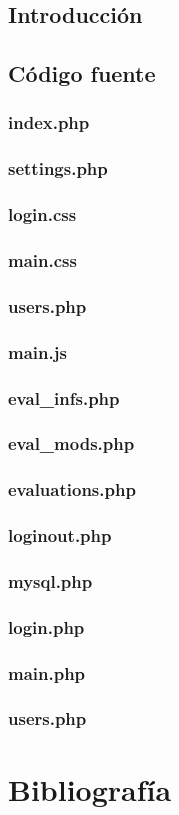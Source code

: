 \documentclass[12pt,a4paper,spanish,twoside]{article}
\begin{document}
\subsection{Introducción}
\subsection{Código fuente}
\subsubsection{index.php}

\subsubsection{settings.php}

\subsubsection{login.css}
%
\subsubsection{main.css}
%
\subsubsection{users.php}
%
\subsubsection{main.js}

\subsubsection{eval\_infs.php}
%
\subsubsection{eval\_mods.php}
%
\subsubsection{evaluations.php}
%
\subsubsection{loginout.php}

\subsubsection{mysql.php}

\subsubsection{login.php}

\subsubsection{main.php}

\subsubsection{users.php}


\section{Bibliografía}
\end{document}
